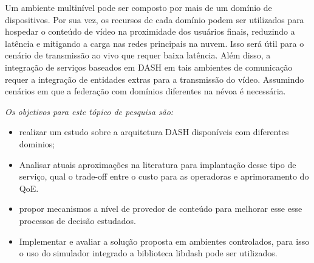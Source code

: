 Um ambiente multinível pode ser composto por mais de um domínio de dispositivos. Por sua vez, 
os recursos de cada domínio podem ser utilizados para hospedar o conteúdo de vídeo na proximidade dos usuários finais, reduzindo a latência e mitigando a carga nas redes principais na nuvem. Isso será útil para o cenário de transmissão ao vivo que requer baixa latência. Além disso, a integração de serviços baseados em DASH em tais ambientes de comunicação requer a integração de entidades extras para a transmissão do vídeo. %
Assumindo cenários em que a federação com domínios diferentes na névoa é necessária.

\emph{Os objetivos para este tópico de pesquisa são: }  

\begin{itemize}
	\item realizar um estudo sobre a arquitetura DASH disponíveis com diferentes dominios;
    \item Analisar atuais aproximações na literatura para implantação desse tipo de serviço, qual o trade-off entre o custo para as operadoras e aprimoramento do QoE.
    \item propor mecanismos a nível de provedor de conteúdo para melhorar esse esse processos de decisão estudados.
    \item Implementar e avaliar a solução proposta em ambientes controlados, para isso o uso do simulador integrado a biblioteca libdash pode ser utilizados.   
\end{itemize}
%
%
%
%
%
